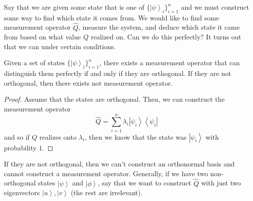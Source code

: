 \documentclass{article}
\newcommand{\ket}[1]{\ensuremath{\left|#1\right\rangle}}
\newcommand{\bra}[1]{\ensuremath{\left\langle#1\right|}}
\begin{document}
    Say that we are given some state that is one of $\{\ket{\psi}_i\}_{i=1}^n$ and we must construct some way to find which state it comes from. We would like to find some measurement operator $\hat{Q}$, measure the system, and deduce which state it came from based on what value $Q$ realized on. Can we do this perfectly? It turns out that we can under certain conditions. 

    \begin{theorem}
      \label{thm:distinguishing-quantum-states}
      Given a set of states $\{\ket{\psi}_i\}_{i=1}^n$, there exists a measurement operator that can distinguish them perfectly if and only if they are orthogonal. If they are not orthogonal, then there exists not measurement operator. 
    \end{theorem}
    \begin{proof} 
      Assume that the states are orthogonal. Then, we can construct the measurement operator 
      \begin{equation} 
        \hat{Q} = \sum_{i=1}^n \lambda_i \ket{\psi_i}\bra{\psi_i}
      \end{equation}
      and so if $Q$ realizes onto $\lambda_i$, then we know that the state was $\ket{\psi_i}$ with probability $1$. 
    \end{proof}
    If they are not orthogonal, then we can't construct an orthonormal basis and cannot construct a measurement operator. Generally, if we have two non-orthogonal states $\ket{\psi}$ and $\ket{\phi}$, say that we want to construct $\hat{Q}$ with just two eigenvectors $\ket{u}, \ket{v}$ (the rest are irrelevant). 
\end{document}
